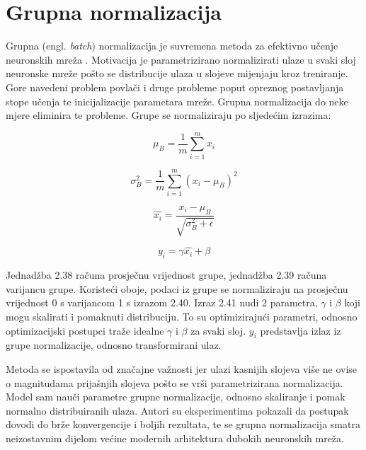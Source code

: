 \documentclass[times, utf8, diplomski]{fer}
\begin{document}
\pagebreak

\section{Grupna normalizacija}
Grupna (engl. \textit{batch}) normalizacija je suvremena metoda za efektivno učenje neuronskih mreža \cite{batchnorm}. Motivacija je parametrizirano normalizirati ulaze u svaki sloj neuronske mreže pošto se distribucije ulaza u slojeve mijenjaju kroz treniranje. Gore navedeni problem povlači i druge probleme poput opreznog postavljanja stope učenja te inicijalizacije parametara mreže. Grupna normalizacija do neke mjere eliminira te probleme. Grupe se normaliziraju po sljedećim izrazima:

\begin{equation}
\mu_B = \frac{1}{m}\sum_{i=1}^m x_i
\end{equation}

\begin{equation}
\sigma_B^2 = \frac{1}{m}\sum_{i=1}^m (x_i - \mu_B)^2
\end{equation}

\begin{equation}
\hat{x_i} = \frac{x_i - \mu_B}{\sqrt{\sigma_B^2 + \epsilon}}
\end{equation}

\begin{equation}
y_i = \gamma \hat{x_i} + \beta
\end{equation}

Jednadžba 2.38 računa prosječnu vrijednost grupe, jednadžba 2.39 računa varijancu grupe. Koristeći oboje, podaci iz grupe se normaliziraju na prosječnu vrijednost 0 s varijancom 1 s izrazom 2.40. Izraz 2.41 nudi 2 parametra, $\gamma$ i $\beta$ koji mogu skalirati i pomaknuti distribuciju. To su optimizirajući parametri, odnosno optimizacijski postupci traže idealne $\gamma$ i $\beta$ za svaki sloj. $y_i$ predstavlja izlaz iz grupe normalizacije, odnosno transformirani ulaz. \par

Metoda se ispostavila od značajne važnosti jer ulazi kasnijih slojeva više ne ovise o magnitudama prijašnjih slojeva pošto se vrši parametrizirana normalizacija. Model sam nauči parametre grupne normalizacije, odnosno skaliranje i pomak normalno distribuiranih ulaza. Autori su eksperimentima pokazali da postupak dovodi do brže konvergencije i boljih rezultata, te se grupna normalizacija smatra neizostavnim dijelom većine modernih arhitektura dubokih neuronskih mreža.\par
\end{document}
